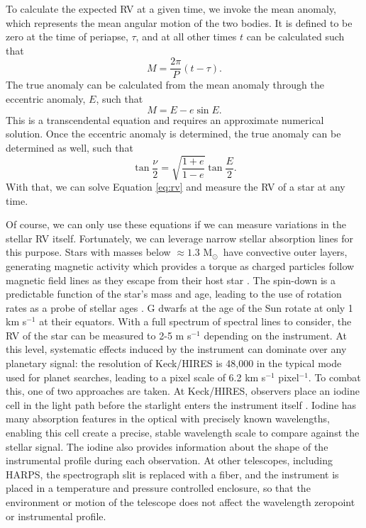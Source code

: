 \documentclass[12pt]{caltech_thesis}
\newcommand{\msun}{{M$_\odot$}}
\begin{document}
To calculate the expected RV at a given time, we invoke the mean anomaly, which represents the mean angular motion of the 
two bodies. 
It is defined to be zero at the time of periapse, $\tau$, and at all other times $t$ can 
be calculated such that
\begin{equation}
M = \frac{2\pi}{P}(t-\tau).
\end{equation}
The true anomaly can be calculated from the mean anomaly through the eccentric anomaly, 
$E$, such that
\begin{equation}
M = E - e \sin E.
\end{equation}
This is a transcendental equation and requires an approximate numerical solution.
Once the eccentric anomaly is determined, the true anomaly can be determined as well,
such that
\begin{equation}
\tan \frac{\nu}{2} = \sqrt{\frac{1+e}{1-e}} \tan \frac{E}{2}.
\end{equation}
With that, we can solve Equation \ref{eq:rv} and measure the RV of a star at any time.

Of course, we can only use these equations if we can measure variations in the stellar RV
itself.
Fortunately, we can leverage narrow stellar absorption lines for this purpose.
Stars with masses below $\approx 1.3$ \msun\ have convective outer layers, generating
magnetic activity which provides a torque as charged particles follow magnetic
field lines as they escape from their host star \citep{Shu94}.
The spin-down is a predictable function of the star's mass and age, leading to the use
of rotation rates as a probe of stellar ages \citep{Barnes03}.
G dwarfs at the age of the Sun rotate at only 1 km s$^{-1}$ at their equators.
With a full spectrum of spectral lines to consider, the RV of the star can be 
measured to 2-5 m s$^{-1}$ depending on the instrument.
At this level, systematic effects induced by the instrument can dominate over any planetary
signal: the resolution of Keck/HIRES is 48,000 in the typical mode used for planet searches,
leading to a pixel scale of 6.2 km s$^{-1}$ pixel$^{-1}$.
To combat this, one of two approaches are taken.
At Keck/HIRES, observers place an iodine cell in the light path before the starlight
enters the instrument itself \citep{Butler96}.
Iodine has many absorption features in the optical with precisely known wavelengths,
enabling this cell create a precise, stable wavelength scale to compare against the stellar
signal. 
The iodine also provides information about the shape of the instrumental profile during
each observation.
At other telescopes, including HARPS, the spectrograph slit is replaced with a fiber,
and the instrument is placed in a temperature and pressure controlled enclosure, so that
the environment or motion of the telescope does not affect the wavelength zeropoint or
instrumental profile.
\end{document}
